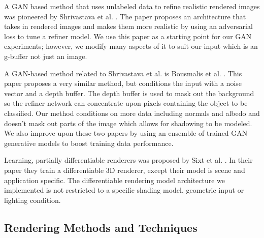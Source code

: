 \documentclass[10pt,twocolumn,letterpaper]{article}
\begin{document}
A GAN based method that uses unlabeled data to refine realistic rendered images was pioneered by
Shrivastava et al. \cite{DBLP:journals/corr/ShrivastavaPTSW16}. The paper proposes an architecture that takes in rendered images and makes them more realistic by using an adversarial loss to tune a refiner model. We use this paper as a starting point for our GAN experiments; however, we modify many aspects of it to suit our input which is an g-buffer not just an image.

A GAN-based method related to Shrivastava et al. is Bousmalis et al. \cite{Bousmalis2016UnsupervisedPD}. This paper proposes a very similar method, but conditions the input with a noise vector and a depth buffer.  The depth buffer is used to mask out the background so the refiner network can concentrate upon pixels containing the object to be classified.  Our method conditions on more data including normals and albedo and doesn't mask out parts of the image which allows for shadowing to be modeled. We also improve upon these two papers by using an ensemble of trained GAN generative models to boost training data performance.

Learning, partially differentiable renderers was proposed by Sixt et al. \cite{DBLP:journals/corr/SixtWL17}. In their paper they train a differentiable 3D renderer, except their model is scene and application specific. The differentiable rendering model architecture we implemented is not restricted to a specific shading model, geometric input or lighting condition.


\subsection{Rendering Methods and Techniques}
\end{document}
